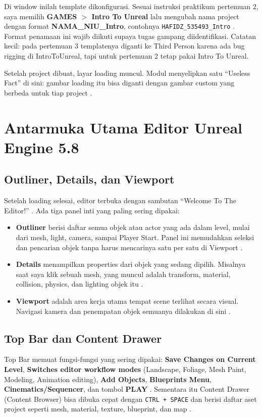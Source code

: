 \documentclass[a4paper,oneside,12pt]{report}
\begin{document}
Di window inilah template dikonfigurasi. Sesuai instruksi praktikum pertemuan 2, saya memilih \textbf{GAMES $>$ Intro To Unreal} lalu mengubah nama project dengan format \textbf{NAMA\_NIU\_Intro}, contohnya \texttt{HAFIDZ\_535493\_Intro} \cite{modul2}. Format penamaan ini wajib diikuti supaya tugas gampang diidentifikasi. Catatan kecil: pada pertemuan 3 templatenya diganti ke Third Person karena ada bug rigging di IntroToUnreal, tapi untuk pertemuan 2 tetap pakai Intro To Unreal.

Setelah project dibuat, layar loading muncul. Modul menyelipkan satu ``Useless Fact'' di sini: gambar loading itu bisa diganti dengan gambar custom yang berbeda untuk tiap project \cite{modul2}.

\section{Antarmuka Utama Editor Unreal Engine 5.8}
\subsection{Outliner, Details, dan Viewport}
Setelah loading selesai, editor terbuka dengan sambutan ``Welcome To The Editor!'' \cite{modul2}. Ada tiga panel inti yang paling sering dipakai:

\begin{itemize}
    \item \textbf{Outliner} berisi daftar semua objek atau actor yang ada dalam level, mulai dari mesh, light, camera, sampai Player Start. Panel ini memudahkan seleksi dan pencarian objek tanpa harus mencarinya satu per satu di Viewport \cite{modul2}.
    \item \textbf{Details} menampilkan properties dari objek yang sedang dipilih. Misalnya saat saya klik sebuah mesh, yang muncul adalah transform, material, collision, physics, dan lighting objek itu \cite{modul2}.
    \item \textbf{Viewport} adalah area kerja utama tempat scene terlihat secara visual. Navigasi kamera dan penempatan objek semuanya dilakukan di sini \cite{modul2}.
\end{itemize}

\subsection{Top Bar dan Content Drawer}
Top Bar memuat fungsi-fungsi yang sering dipakai: \textbf{Save Changes on Current Level}, \textbf{Switches editor workflow modes} (Landscape, Foliage, Mesh Paint, Modeling, Animation editing), \textbf{Add Objects}, \textbf{Blueprints Menu}, \textbf{Cinematics/Sequencer}, dan tombol \textbf{PLAY} \cite{modul2}. Sementara itu Content Drawer (Content Browser) bisa dibuka cepat dengan \texttt{CTRL + SPACE} dan berisi daftar aset project seperti mesh, material, texture, blueprint, dan map \cite{modul2}.
\end{document}

